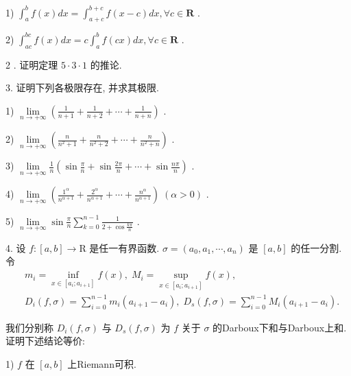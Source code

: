 1) ${\int }_{a}^{b}f\left( x\right) {dx} = {\int }_{a + c}^{b + c}f\left( {x - c}\right) {dx},\forall c \in  \mathbf{R}$ .

2) ${\int }_{ac}^{bc}f\left( x\right) {dx} = c{\int }_{a}^{b}f\left( {cx}\right) {dx},\forall c \in  \mathbf{R}$ .

2 . 证明定理 $5 \cdot  3 \cdot  1$ 的推论.

3. 证明下列各极限存在, 并求其极限.

1) $\mathop{\lim }\limits_{{n \rightarrow   + \infty }}\left( {\frac{1}{n + 1} + \frac{1}{n + 2} + \cdots  + \frac{1}{n + n}}\right)$ .

2) $\mathop{\lim }\limits_{{n \rightarrow   + \infty }}\left( {\frac{n}{{n}^{2} + 1} + \frac{n}{{n}^{2} + 2} + \cdots  + \frac{n}{{n}^{2} + n}}\right)$ .

3) $\mathop{\lim }\limits_{{n \rightarrow   + \infty }}\frac{1}{n}\left( {\sin \frac{\pi }{n} + \sin \frac{2\pi }{n} + \cdots  + \sin \frac{n\pi }{n}}\right)$ .

4) $\mathop{\lim }\limits_{{n \rightarrow   + \infty }}\left( {\frac{{1}^{\alpha }}{{n}^{\alpha  + 1}} + \frac{{2}^{\alpha }}{{n}^{\alpha  + 1}} + \cdots  + \frac{{n}^{\alpha }}{{n}^{\alpha  + 1}}}\right) \;\left( {\alpha  > 0}\right)$ .

5) $\mathop{\lim }\limits_{{n \rightarrow   + \infty }}\sin \frac{\pi }{n}\mathop{\sum }\limits_{{k = 0}}^{{n - 1}}\frac{1}{2 + \cos \frac{k\pi }{n}}$ .

4. 设 $f : \left\lbrack  {a,b}\right\rbrack   \rightarrow  \mathrm{R}$ 是任一有界函数. $\sigma  = \left( {{a}_{0},{a}_{1},\cdots ,{a}_{n}}\right)$ 是 $\left\lbrack  {a,b}\right\rbrack$ 的任一分割. 令
\begin{align*}
	&{m}_{i} = \mathop{\inf }\limits_{{x \in  \left\lbrack  {{a}_{i};{a}_{i + 1}}\right\rbrack  }}f\left( x\right) ,\;{M}_{i} = \mathop{\sup }\limits_{{x \in  \left\lbrack  {{a}_{i};{a}_{i + 1}}\right\rbrack  }}f\left( x\right) ,\\
	&{D}_{i}\left( {f,\sigma }\right)  = \mathop{\sum }\limits_{{i = 0}}^{{n - 1}}{m}_{i}\left( {{a}_{i + 1} - {a}_{i}}\right) ,\;{D}_{s}\left( {f,\sigma }\right)  = \mathop{\sum }\limits_{{i = 0}}^{{n - 1}}{M}_{i}\left( {{a}_{i + 1} - {a}_{i}}\right) .
\end{align*}

我们分别称 ${D}_{i}\left( {f,\sigma }\right)$ 与 ${D}_{s}\left( {f,\sigma }\right)$ 为 $f$ 关于 $\sigma$ 的Darboux下和与Darboux上和. 证明下述结论等价:

1) $f$ 在 $\left\lbrack  {a,b}\right\rbrack$ 上Riemann可积.

